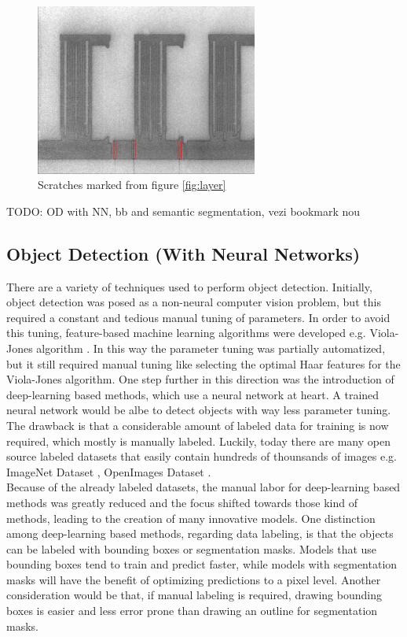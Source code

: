\begin{figure}[ht]
  \includegraphics[width=0.65\textwidth]{images/layer_00325_marked_cropped}
  \centering
  \caption{Scratches marked from figure \ref{fig:layer}}
  \label{fig:layer_00325_marked_cropped}
\end{figure}

TODO: OD with NN, bb and semantic segmentation, vezi bookmark nou
\subsection{Object Detection (With Neural Networks)}
There are a variety of techniques used to perform object detection. Initially, object detection was posed as a non-neural computer vision problem, but this required a constant and tedious manual tuning of parameters. In order to avoid this tuning, feature-based machine learning algorithms were developed e.g. Viola-Jones algorithm  \cite{viola_joines_paper}. In this way the parameter tuning was partially automatized, but it still required manual tuning like selecting the optimal Haar features for the Viola-Jones algorithm.
One step further in this direction was the introduction of deep-learning based methods, which use a neural network at heart. A trained neural network would be albe to detect objects with way less parameter tuning. The drawback is that a considerable amount of labeled data for training is now required, which mostly is manually labeled. Luckily, today there are many open source labeled datasets that easily contain hundreds of thounsands of images e.g. ImageNet Dataset \cite{imagenet_site}, OpenImages Dataset \cite{openimages_site}. \\
Because of the already labeled datasets, the manual labor for deep-learning based methods was greatly reduced and the focus shifted towards those kind of methods, leading to the creation of many innovative models. One distinction among deep-learning based methods, regarding data labeling, is that the objects can be labeled with bounding boxes or segmentation masks. Models that use bounding boxes tend to train and predict faster, while models with segmentation masks will have the benefit of optimizing predictions to a pixel level. Another consideration would be that, if manual labeling is required, drawing bounding boxes is easier and less error prone than drawing an outline for segmentation masks. \\

